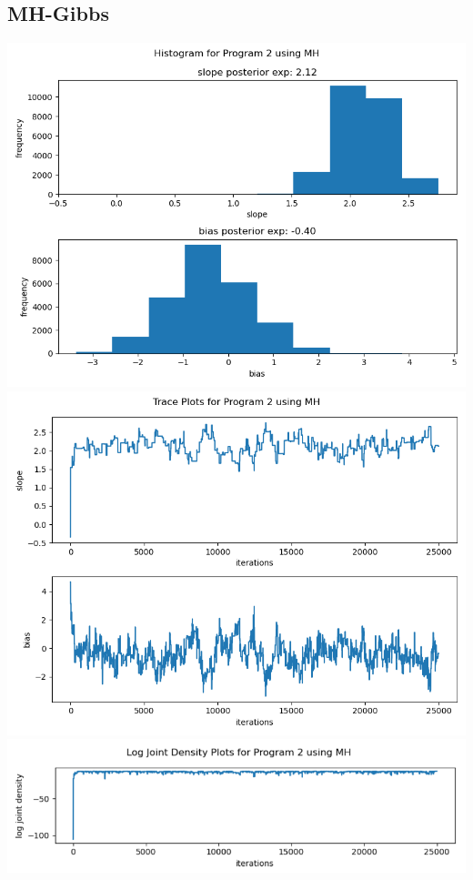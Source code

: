\documentclass[10pt]{homeworg}
\begin{document}
\subsection{MH-Gibbs}
\begin{center}
\includegraphics[scale=0.5]{figures/MH_program_2.png}
\includegraphics[scale=0.5]{figures/trace_MH_program_2.png}
\includegraphics[scale=0.58]{figures/log_joint_MH_program_2.png}
\end{center}
\end{document}
